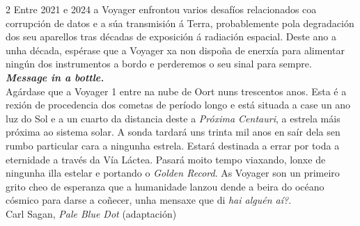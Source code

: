 \begin{multicols}{2}
Entre 2021 e 2024 a Voyager enfrontou varios desafíos relacionados coa
corrupción de datos e a súa transmisión á Terra, probablemente pola degradación
dos seu aparellos tras décadas de exposición á radiación espacial. Deste ano a
unha década, espérase que a Voyager xa non dispoña de enerxía para alimentar
ningún dos instrumentos a bordo e perderemos o seu sinal para sempre.\\

\textbf{\textit{Message in a bottle.}}\\
Agárdase que a Voyager 1 entre na nube de Oort nuns trescentos anos. Esta é a
rexión de procedencia dos cometas de período longo e está situada a case un ano
luz do Sol e a un cuarto da distancia deste a \textit{Próxima Centauri}, a
estrela máis próxima ao sistema solar. A sonda tardará uns trinta mil anos en
saír dela sen rumbo particular cara a ningunha estrela. Estará destinada a
errar por toda a eternidade a través da Vía Láctea. Pasará moito tempo
viaxando, lonxe de ningunha illa estelar e portando o \textit{Golden Record}.
As Voyager son un primeiro grito cheo de esperanza que a humanidade lanzou
dende a beira do océano cósmico para darse a coñecer, unha mensaxe que di
\textit{hai alguén aí?}. \\

%
{Carl Sagan, \textit{Pale Blue Dot} (adaptación)}



\nocite{oliver-berry.dmagmmvs_2019}
\nocite{sagan.c_2014}
\nocite{science_nasa_mission_voyager_timeline}
\nocite{photojournal_jpl_voyager_1}
\nocite{nasa_nssdc_gsfc}


\printbibliography

\end{multicols}
